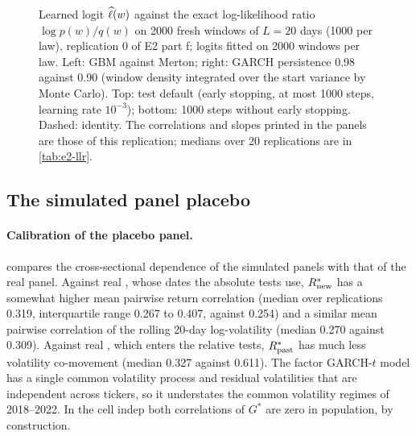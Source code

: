 \begin{figure}[tbp]
  \centering
  \caption{Learned logit $\widehat{\ell}(w)$ against the exact log-likelihood ratio $\log p(w)/q(w)$ on 2000
    fresh windows of $L=20$ days (1000 per law), replication 0 of E2 part f; logits fitted on 2000
    windows per law. Left: GBM against Merton; right: GARCH persistence 0.98 against 0.90 (window
    density integrated over the start variance by Monte Carlo). Top: test default (early stopping,
    at most 1000 steps, learning rate $10^{-3}$); bottom: 1000 steps without early stopping.
    Dashed: identity. The correlations and slopes printed in the panels are those of this
    replication; medians over 20 replications are in \cref{tab:e2-llr}.}
  \label{fig:e2-llr-scatter}
\end{figure}

\subsection{The simulated panel placebo}\label{app:sim-e1}

\paragraph{Calibration of the placebo panel.}
 compares the cross-sectional dependence of the simulated panels with
that of the real panel. Against real \TEST{}, whose dates the absolute tests use, $R_{\mathrm{new}}^*$ has a
somewhat higher mean pairwise return correlation (median over replications 0.319, interquartile
range 0.267 to 0.407, against 0.254) and a similar mean pairwise correlation of the rolling 20-day
log-volatility (median 0.270 against 0.309). Against real \TRAIN{}, which enters the relative
tests, $R_{\mathrm{past}}^*$ has much less volatility co-movement (median 0.327 against 0.611). The factor
GARCH-$t$ model has a single common volatility process and residual volatilities that are
independent across tickers, so it understates the common volatility regimes of 2018--2022. In the
cell indep both correlations of $G^*$ are zero in population, by construction.

\begin{table}[tbp]
  \centering
  \caption{Cross-sectional dependence of the real panel and of the E1(a) placebo panels (100
    tickers): mean pairwise correlation of daily returns and of the rolling 20-day log-volatility.
    Placebo rows: median over 200 replications of these means, interquartile range in brackets.}
  \label{tab:e1-sim-dependence}
  \small
\end{table}

